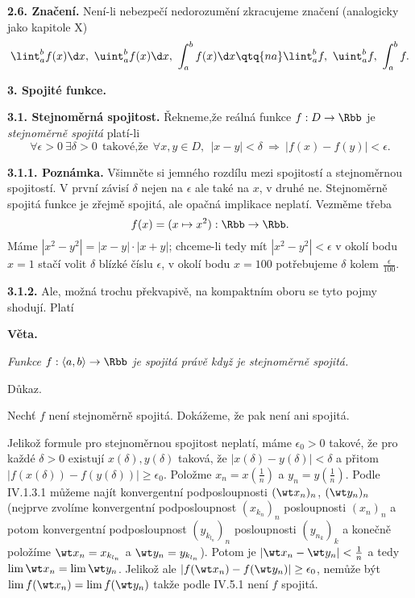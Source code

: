 \documentclass[12pt]{article}
\begin{document}
{ \bigskip
 
 {\bf 2.6. Značení.} Není-li nebezpečí nedorozumění  zkracujeme značení (analogicky jako kapitole X) 
 $$
 \lint_a^bf(x)\d x,\ \uint_a^bf(x)\d x,\ \int_a^bf(x)\d x\qtq{na}\lint_a^bf,\ \uint_a^bf,\ \int_a^bf.
 $$
 
 \vskip10mm
 
 {\large\bf 3. Spojité funkce.} 
 
 \bigskip
 
 {\bf 3.1. Stejnoměrná spojitost.} Řekneme,že reálná funkce $f:D\to\Rbb$ je {\em stejnoměrně spojitá} platí-li
 $$
 \forall \epsilon>0 \ \exists \delta>0\ \ \text{takové,že}\ \ \forall x,y\in D, \ \ |x-y|<\delta\ \Rightarrow\ 
 |f(x)-f(y)|<\epsilon.
 $$
 
 \medskip
 
 {\bf 3.1.1. Poznámka.} Všimněte si jemného rozdílu mezi spojitostí a stejnoměrnou spojitostí. V první závisí $\delta$ nejen na $\epsilon$ ale také na $x$, v druhé ne. Stejnoměrně spojitá funkce je zřejmě spojitá, ale opačná implikace neplatí. Vezměme třeba
 $$
 f(x)=(x\mapsto x^2):\Rbb\to\Rbb.
 $$
 Máme $|x^2-y^2|=|x-y|\cdot|x+y|$;  chceme-li tedy mít $|x^2-y^2|<\epsilon$ v okolí bodu $x=1$ stačí volit $\delta$ blízké číslu $\epsilon$, v okolí bodu $x=100$ potřebujeme $\delta$ kolem $\frac{\epsilon}{100}$.
 
 \medskip
 
 {\bf 3.1.2.} Ale, možná trochu překvapivě, na kompaktním oboru se tyto pojmy shodují. Platí
 
 \medskip
 
 {\bf Věta.} {\em Funkce $f:\langle a,b \rangle \to\Rbb$ je spojitá právě když je stejnoměrně spojitá.
 
 Důkaz.} Nechť $f$ není stejnoměrně spojitá. Dokážeme, že pak není ani spojitá.
 
 Jelikož formule pro stejnoměrnou spojitost neplatí, máme  $\epsilon_0>0$ takové, že pro každé $\delta>0$ existují $x(\delta), y(\delta)$ takov\'a, že $|x(\delta)- y(\delta)|<\delta$ a přitom
 $|f(x(\delta))-f(y(\delta))|\geq \epsilon_0$. Položme $x_n=x(\frac{1}{n})$ a $y_n=y(\frac{1}{n})$. Podle IV.1.3.1 můžeme najít konvergentní podposloupnosti $(\wt x_{n})_n$, $(\wt y_{n})_n$  (nejprve zvolíme konvergentní podposloupnost $(x_{k_n})_n$ posloupnosti $(x_n)_n$ a potom konvergentní podposloupnost  $(y_{k_{l_n}})_n$ posloupnosti $(y_{n_k})_k$ a konečně položíme $\wt x_n=x_{k_{l_n}}$ a 
 $\wt y_n=y_{k_{l_n}}$). Potom je $|\wt x_n- \wt y_n|<\frac1{n}$ a tedy $\lim \wt x_n=\lim \wt y_n$. Jelikož ale
$|f(\wt x_n)- f(\wt y_n)|\geq\epsilon_0$, nemůže být $\lim f(\wt x_n)=\lim f(\wt y_n)$ takže podle IV.5.1 není $f$  spojitá. \sq

}
\end{document}
